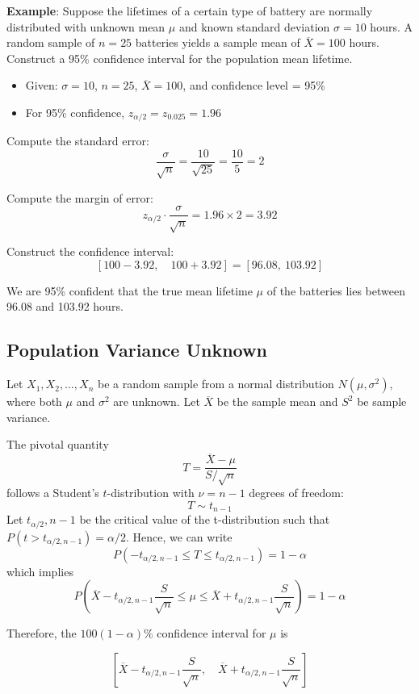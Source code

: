 \documentclass[twoside]{book}
\begin{document}
\textbf{Example}: Suppose the lifetimes of a certain type of battery are normally distributed with unknown mean $\mu$ and known standard deviation $\sigma = 10$ hours. A random sample of $n = 25$ batteries yields a sample mean of $\overline{X} = 100$ hours. Construct a 95\% confidence interval for the population mean lifetime.


\begin{itemize}
	\item Given: $\sigma = 10$, $n = 25$, $\overline{X} = 100$, and confidence level = 95\%
	\item For 95\% confidence, $z_{\alpha/2}= z_{0.025} = 1.96$
\end{itemize}

Compute the standard error:
\[
\frac{\sigma}{\sqrt{n}} = \frac{10}{\sqrt{25}} = \frac{10}{5} = 2
\]

Compute the margin of error:
\[
z_{\alpha/2} \cdot \frac{\sigma}{\sqrt{n}} = 1.96 \times 2 = 3.92
\]

Construct the confidence interval:
\[
\left[100 - 3.92, \quad 100 + 3.92\right] = [96.08,\ 103.92]
\]

We are 95\% confident that the true mean lifetime $\mu$ of the batteries lies between 96.08 and 103.92 hours.

\subsection{Population Variance Unknown}

Let $X_1, X_2, \dots, X_n$ be a random sample from a normal distribution $N(\mu, \sigma^2)$, where both $\mu$ and $\sigma^2$ are unknown. Let $\overline{X}$ be the sample mean and $S^2$ be sample variance.

The pivotal quantity
\[
T = \frac{\overline{X} - \mu}{S / \sqrt{n}}
\]
follows a Student's $t$-distribution with $\nu = n - 1$ degrees of freedom:
\[
T \sim t_{n-1}
\]
Let $t_{\alpha/2}, n-1$ be the critical value of the t-distribution such that $P(t > t_{\alpha/2, n-1})=\alpha/2$. Hence, we can write
\[
P\left(-t_{\alpha/2, n-1} \leq T \leq t_{\alpha/2, n-1}\right) = 1 - \alpha
\]
which implies
\[
P\left(\overline{X} - t_{\alpha/2, n-1} \frac{S}{\sqrt{n}} \leq \mu \leq \overline{X} + t_{\alpha/2, n-1} \frac{S}{\sqrt{n}}\right) = 1 - \alpha
\]

Therefore, the $100(1-\alpha)\%$ confidence interval for $\mu$ is
\begin{textbox}
\[
\left[\overline{X} - t_{\alpha/2, n-1} \frac{S}{\sqrt{n}}, \quad \overline{X} + t_{\alpha/2, n-1} \frac{S}{\sqrt{n}} \right]
\]
\end{textbox}
\end{document}
